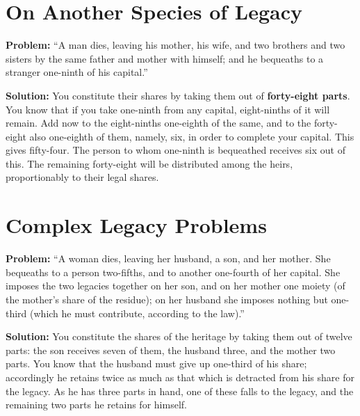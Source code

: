 \documentclass[11pt,a4paper]{book}
\begin{document}
\begin{minipage}[t]{0.48\textwidth}
\raggedright

\section*{On Another Species of Legacy}

\textbf{Problem:} ``A man dies, leaving his mother, his wife, and two brothers and two sisters by the same father and mother with himself; and he bequeaths to a stranger one-ninth of his capital.''

\textbf{Solution:} You constitute their shares by taking them out of \textbf{forty-eight parts}. You know that if you take one-ninth from any capital, eight-ninths of it will remain. Add now to the eight-ninths one-eighth of the same, and to the forty-eight also one-eighth of them, namely, six, in order to complete your capital. This gives fifty-four. The person to whom one-ninth is bequeathed receives six out of this. The remaining forty-eight will be distributed among the heirs, proportionably to their legal shares.

\vspace{0.3cm}

\section*{Complex Legacy Problems}

\textbf{Problem:} ``A woman dies, leaving her husband, a son, and her mother. She bequeaths to a person two-fifths, and to another one-fourth of her capital. She imposes the two legacies together on her son, and on her mother one moiety (of the mother's share of the residue); on her husband she imposes nothing but one-third (which he must contribute, according to the law).''

\textbf{Solution:} You constitute the shares of the heritage by taking them out of twelve parts: the son receives seven of them, the husband three, and the mother two parts. You know that the husband must give up one-third of his share; accordingly he retains twice as much as that which is detracted from his share for the legacy. As he has three parts in hand, one of these falls to the legacy, and the remaining two parts he retains for himself.

\end{minipage}
\vspace{0.3cm}
\end{document}
